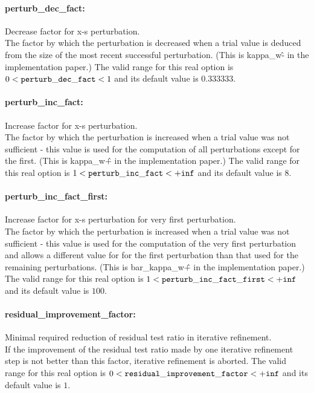 \paragraph{perturb\_dec\_fact:}\label{sec:perturb_dec_fact} Decrease factor for x-s perturbation. $\;$ \\
 The factor by which the perturbation is decreased
when a trial value is deduced from the size of
the most recent successful perturbation. (This is
kappa\_w\^- in the implementation paper.) The valid range for this real option is 
$0 <  {\tt perturb\_dec\_fact } <  1$
and its default value is $0.333333$.


\paragraph{perturb\_inc\_fact:}\label{sec:perturb_inc_fact} Increase factor for x-s perturbation. $\;$ \\
 The factor by which the perturbation is increased
when a trial value was not sufficient - this
value is used for the computation of all
perturbations except for the first. (This is
kappa\_w\^+ in the implementation paper.) The valid range for this real option is 
$1 <  {\tt perturb\_inc\_fact } <  {\tt +inf}$
and its default value is $8$.


\paragraph{perturb\_inc\_fact\_first:}\label{sec:perturb_inc_fact_first} Increase factor for x-s perturbation for very first perturbation. $\;$ \\
 The factor by which the perturbation is increased
when a trial value was not sufficient - this
value is used for the computation of the very
first perturbation and allows a different value
for for the first perturbation than that used for
the remaining perturbations. (This is
bar\_kappa\_w\^+ in the implementation paper.) The valid range for this real option is 
$1 <  {\tt perturb\_inc\_fact\_first } <  {\tt +inf}$
and its default value is $100$.


\paragraph{residual\_improvement\_factor:}\label{sec:residual_improvement_factor} Minimal required reduction of residual test ratio in iterative refinement. $\;$ \\
 If the improvement of the residual test ratio
made by one iterative refinement step is not
better than this factor, iterative refinement is
aborted. The valid range for this real option is 
$0 <  {\tt residual\_improvement\_factor } <  {\tt +inf}$
and its default value is $1$.


